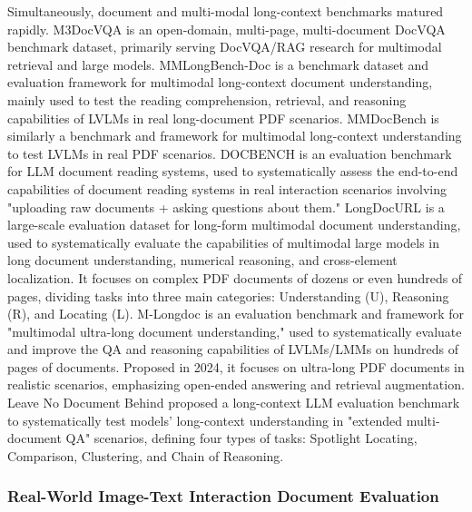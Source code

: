 Simultaneously, document and multi-modal long-context benchmarks matured rapidly. M3DocVQA \cite{m3docvqa2024} is an open-domain, multi-page, multi-document DocVQA benchmark dataset, primarily serving DocVQA/RAG research for multimodal retrieval and large models. MMLongBench-Doc \cite{mmlongbenchdoc2024} is a benchmark dataset and evaluation framework for multimodal long-context document understanding, mainly used to test the reading comprehension, retrieval, and reasoning capabilities of LVLMs in real long-document PDF scenarios. MMDocBench \cite{mmdocbench2024} is similarly a benchmark and framework for multimodal long-context understanding to test LVLMs in real PDF scenarios. DOCBENCH \cite{docbench2024} is an evaluation benchmark for LLM document reading systems, used to systematically assess the end-to-end capabilities of document reading systems in real interaction scenarios involving "uploading raw documents + asking questions about them." LongDocURL \cite{longdocurl2024} is a large-scale evaluation dataset for long-form multimodal document understanding, used to systematically evaluate the capabilities of multimodal large models in long document understanding, numerical reasoning, and cross-element localization. It focuses on complex PDF documents of dozens or even hundreds of pages, dividing tasks into three main categories: Understanding (U), Reasoning (R), and Locating (L). M-Longdoc \cite{mlongdoc2024} is an evaluation benchmark and framework for "multimodal ultra-long document understanding," used to systematically evaluate and improve the QA and reasoning capabilities of LVLMs/LMMs on hundreds of pages of documents. Proposed in 2024, it focuses on ultra-long PDF documents in realistic scenarios, emphasizing open-ended answering and retrieval augmentation. Leave No Document Behind \cite{leavenodocumentbehind2024} proposed a long-context LLM evaluation benchmark to systematically test models' long-context understanding in "extended multi-document QA" scenarios, defining four types of tasks: Spotlight Locating, Comparison, Clustering, and Chain of Reasoning.

\subsubsection{Real-World Image-Text Interaction Document Evaluation}

